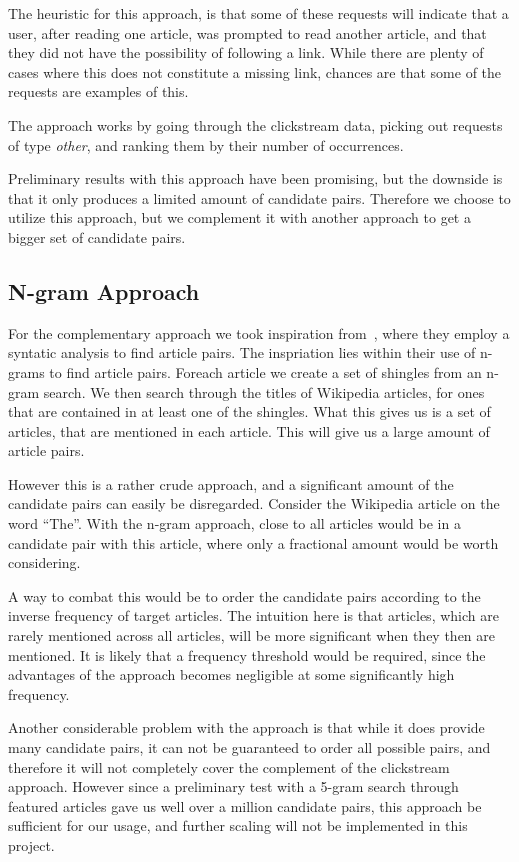 The heuristic for this approach, is that some of these requests will indicate that a user, after reading one article, was prompted to read another article, and that they did not have the possibility of following a link. While there are plenty of cases where this does not constitute a missing link, chances are that some of the requests are examples of this.

The approach works by going through the clickstream data, picking out requests of type \emph{other}, and ranking them by their number of occurrences.

Preliminary results with this approach have been promising, but the downside is that it only produces a limited amount of candidate pairs. Therefore we choose to utilize this approach, but we complement it with another approach to get a bigger set of candidate pairs.

\subsection{N-gram Approach}

For the complementary approach we took inspiration from~\cite{milne2008learning}, where they employ a syntatic analysis to find article pairs. The inspriation lies within their use of n-grams to find article pairs. Foreach article we create a set of shingles from an n-gram search. We then search through the titles of Wikipedia articles, for ones that are contained in at least one of the shingles. What this gives us is a set of articles, that are mentioned in each article. This will give us a large amount of article pairs.

However this is a rather crude approach, and a significant amount of the candidate pairs can easily be disregarded. Consider the Wikipedia article on the word \enquote{The}. With the n-gram approach, close to all articles would be in a candidate pair with this article, where only a fractional amount would be worth considering.

A way to combat this would be to order the candidate pairs according to the inverse frequency of target articles. The intuition here is that articles, which are rarely mentioned across all articles, will be more significant when they then are mentioned. It is likely that a frequency threshold would be required, since the advantages of the approach becomes negligible at some significantly high frequency.

Another considerable problem with the approach is that while it does provide many candidate pairs, it can not be guaranteed to order all possible pairs, and therefore it will not completely cover the complement of the clickstream approach. However since a preliminary test with a 5-gram search through featured articles gave us well over a million candidate pairs, this approach be sufficient for our usage, and further scaling will not be implemented in this project.



